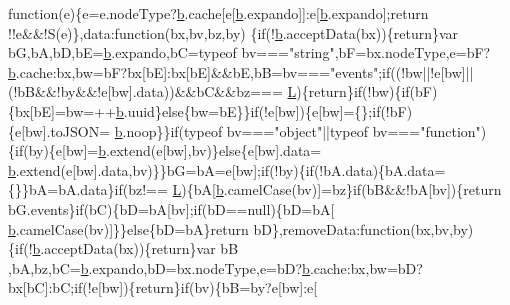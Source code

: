 \begin{DoxyCode}
{      function}(e)\{e=e.nodeType?\hyperlink{a00039_aa4026ad5544b958e54ce5e106fa1c805}{b}.cache[e[\hyperlink{a00039_aa4026ad5544b958e54ce5e106fa1c805}{b}.expando]]:e[\hyperlink{a00039_aa4026ad5544b958e54ce5e106fa1c805}{b}.expando];\textcolor{keywordflow}{return} !!e&&!S(e)\},data:\textcolor{keyword}{function}(bx,bv,bz,by)
      \{\textcolor{keywordflow}{if}(!\hyperlink{a00039_aa4026ad5544b958e54ce5e106fa1c805}{b}.acceptData(bx))\{\textcolor{keywordflow}{return}\}var bG,bA,bD,bE=\hyperlink{a00039_aa4026ad5544b958e54ce5e106fa1c805}{b}.expando,bC=typeof bv===\textcolor{stringliteral}{"string"},bF=bx.nodeType,e=bF?
      \hyperlink{a00039_aa4026ad5544b958e54ce5e106fa1c805}{b}.cache:bx,bw=bF?bx[bE]:bx[bE]&&bE,bB=bv===\textcolor{stringliteral}{"events"};\textcolor{keywordflow}{if}((!bw||!e[bw]||(!bB&&!by&&!e[bw].data))&&bC&&bz===
      \hyperlink{a00039_a38ee4c0b5f4fe2a18d0c783af540d253}{L})\{\textcolor{keywordflow}{return}\}\textcolor{keywordflow}{if}(!bw)\{\textcolor{keywordflow}{if}(bF)\{bx[bE]=bw=++\hyperlink{a00039_aa4026ad5544b958e54ce5e106fa1c805}{b}.uuid\}\textcolor{keywordflow}{else}\{bw=bE\}\}\textcolor{keywordflow}{if}(!e[bw])\{e[bw]=\{\};\textcolor{keywordflow}{if}(!bF)\{e[bw].toJSON=
      \hyperlink{a00039_aa4026ad5544b958e54ce5e106fa1c805}{b}.noop\}\}\textcolor{keywordflow}{if}(typeof bv===\textcolor{stringliteral}{"object"}||typeof bv===\textcolor{stringliteral}{"function"})\{\textcolor{keywordflow}{if}(by)\{e[bw]=\hyperlink{a00039_aa4026ad5544b958e54ce5e106fa1c805}{b}.extend(e[bw],bv)\}\textcolor{keywordflow}{else}\{e[bw].data=
      \hyperlink{a00039_aa4026ad5544b958e54ce5e106fa1c805}{b}.extend(e[bw].data,bv)\}\}bG=bA=e[bw];\textcolor{keywordflow}{if}(!by)\{\textcolor{keywordflow}{if}(!bA.data)\{bA.data=\{\}\}bA=bA.data\}\textcolor{keywordflow}{if}(bz!==
      \hyperlink{a00039_a38ee4c0b5f4fe2a18d0c783af540d253}{L})\{bA[\hyperlink{a00039_aa4026ad5544b958e54ce5e106fa1c805}{b}.camelCase(bv)]=bz\}\textcolor{keywordflow}{if}(bB&&!bA[bv])\{\textcolor{keywordflow}{return} bG.events\}\textcolor{keywordflow}{if}(bC)\{bD=bA[bv];\textcolor{keywordflow}{if}(bD==null)\{bD=bA[
      \hyperlink{a00039_aa4026ad5544b958e54ce5e106fa1c805}{b}.camelCase(bv)]\}\}\textcolor{keywordflow}{else}\{bD=bA\}\textcolor{keywordflow}{return} bD\},removeData:\textcolor{keyword}{function}(bx,bv,by)\{\textcolor{keywordflow}{if}(!\hyperlink{a00039_aa4026ad5544b958e54ce5e106fa1c805}{b}.acceptData(bx))\{\textcolor{keywordflow}{return}\}var bB
      ,bA,bz,bC=\hyperlink{a00039_aa4026ad5544b958e54ce5e106fa1c805}{b}.expando,bD=bx.nodeType,e=bD?\hyperlink{a00039_aa4026ad5544b958e54ce5e106fa1c805}{b}.cache:bx,bw=bD?bx[bC]:bC;\textcolor{keywordflow}{if}(!e[bw])\{\textcolor{keywordflow}{return}\}\textcolor{keywordflow}{if}(bv)\{bB=by?e[bw]:e[

\end{DoxyCode}
